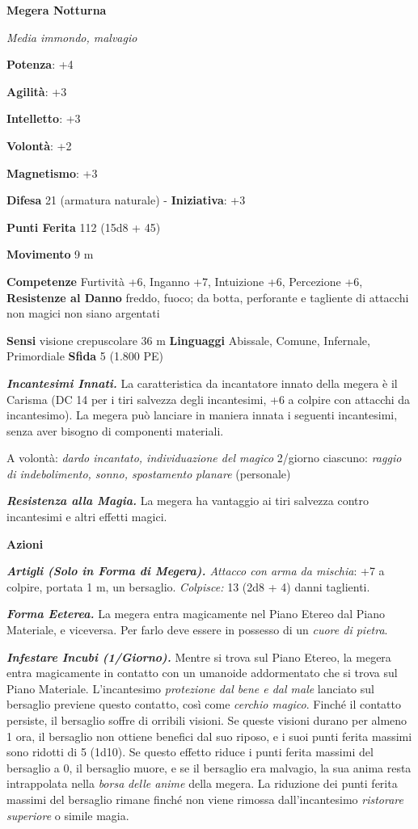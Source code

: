 \begin{multicols}{2}
\textbf{Megera Notturna}

\emph{Media immondo, malvagio}

\textbf{Potenza}: +4

\textbf{Agilità}: +3

\textbf{Intelletto}: +3

\textbf{Volontà}: +2

\textbf{Magnetismo}: +3

\textbf{Difesa} 21 (armatura naturale) - \textbf{Iniziativa}: +3

\textbf{Punti Ferita} 112 (15d8 + 45)

\textbf{Movimento} 9 m

\textbf{Competenze} Furtività +6, Inganno +7, Intuizione +6, Percezione +6,
\textbf{Resistenze al Danno} freddo, fuoco; da botta, perforante e
tagliente di attacchi non magici non siano argentati

\textbf{Sensi} visione crepuscolare 36 m
\textbf{Linguaggi} Abissale, Comune, Infernale, Primordiale
\textbf{Sfida} 5 (1.800 PE)\smallskip

\emph{\textbf{Incantesimi Innati.}} La caratteristica da incantatore
innato della megera è il Carisma (DC 14 per i tiri salvezza degli
incantesimi, +6 a colpire con attacchi da incantesimo). La megera può
lanciare in maniera innata i seguenti incantesimi, senza aver bisogno di
componenti materiali.

A volontà: \emph{dardo incantato, individuazione del magico} 2/giorno
ciascuno: \emph{raggio di indebolimento, sonno, spostamento}
\emph{planare} (personale)

\emph{\textbf{Resistenza alla Magia.}} La megera ha vantaggio ai tiri
salvezza contro incantesimi e altri effetti magici.

\smallskip\textbf{Azioni}

\emph{\textbf{Artigli (Solo in Forma di Megera).} Attacco con arma da
mischia}: +7 a colpire, portata 1 m, un bersaglio. \emph{Colpisce:} 13
(2d8 + 4) danni taglienti.

\emph{\textbf{Forma Eeterea.}} La megera entra magicamente nel Piano
Etereo dal Piano Materiale, e viceversa. Per farlo deve essere in
possesso di un \emph{cuore di pietra}.

\emph{\textbf{Infestare Incubi (1/Giorno).}} Mentre si trova sul Piano
Etereo, la megera entra magicamente in contatto con un umanoide
addormentato che si trova sul Piano Materiale. L'incantesimo
\emph{protezione dal bene e dal male} lanciato sul bersaglio previene
questo contatto, così come \emph{cerchio magico}. Finché il contatto
persiste, il bersaglio soffre di orribili visioni. Se queste visioni
durano per almeno 1 ora, il bersaglio non ottiene benefici dal suo
riposo, e i suoi punti ferita massimi sono ridotti di 5 (1d10). Se
questo effetto riduce i punti ferita massimi del bersaglio a 0, il
bersaglio muore, e se il bersaglio era malvagio, la sua anima resta
intrappolata nella \emph{borsa} \emph{delle anime} della megera. La
riduzione dei punti ferita massimi del bersaglio rimane finché non viene
rimossa dall'incantesimo \emph{ristorare} \emph{superiore} o simile
magia.


\end{multicols}

